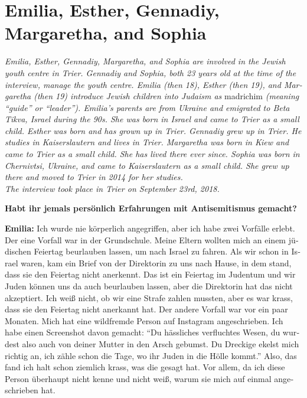 \section{Emilia, Esther, Gennadiy, Margaretha, and Sophia}
\begin{otherlanguage}{ngerman}
\textit{Emilia, Esther, Gennadiy, Margaretha, and Sophia are involved in the Jewish youth centre in Trier. Gennadiy and Sophia, both 23 years old at the time of the interview, manage the youth centre. Emilia (then 18), Esther (then 19), and Margaretha (then 19) introduce Jewish children into Judaism as} madrichim \textit{(meaning ``guide'' or ``leader''). Emilia’s parents are from Ukraine and emigrated to Beta Tikva, Israel during the 90s. She was born in Israel and came to Trier as a small child. Esther was born and has grown up in Trier. Gennadiy grew up in Trier. He studies in Kaiserslautern and lives in Trier. Margaretha was born in Kiew and came to Trier as a small child. She has lived there ever since. Sophia was born in Chernivtsi, Ukraine, and came to Kaiserslautern as a small child. She grew up there and moved to Trier in 2014 for her studies.\\
The interview took place in Trier on September 23rd, 2018.}\par   
\vspace*{2em}
\textbf{Habt ihr jemals persönlich Erfahrungen mit Antisemitismus gemacht?} 

\textbf{Emilia:} Ich wurde nie körperlich angegriffen, aber ich habe zwei Vorfälle erlebt. Der eine Vorfall war in der Grundschule. Meine Eltern wollten mich an einem jüdischen Feiertag beurlauben lassen, um nach Israel zu fahren. Als wir schon in Israel waren, kam ein Brief von der Direktorin zu uns nach Hause, in dem stand, dass sie den Feiertag nicht anerkennt. Das ist ein Feiertag im Judentum und wir Juden können uns da auch beurlauben lassen, aber die Direktorin hat das nicht akzeptiert. Ich weiß nicht, ob wir eine Strafe zahlen mussten, aber es war krass, dass sie den Feiertag nicht anerkannt hat. Der andere Vorfall war vor ein paar Monaten. Mich hat eine wildfremde Person auf Instagram angeschrieben. Ich habe einen Screenshot davon gemacht: "`Du hässliches verfluchtes Wesen, du wurdest also auch von deiner Mutter in den Arsch gebumst. Du Dreckige ekelst mich richtig an, ich zähle schon die Tage, wo ihr Juden in die Hölle kommt."' Also, das fand ich halt schon ziemlich krass, was die gesagt hat.  Vor allem, da ich diese Person überhaupt nicht kenne und nicht weiß, warum sie mich auf einmal angeschrieben hat. 


\end{otherlanguage}
